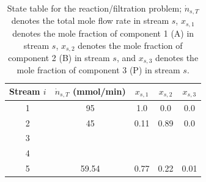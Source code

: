     \begin{table}[!ht]
      \centering
      \caption{State table for the reaction/filtration problem; $\dot{n}_{s,T}$ denotes the total mole flow rate in stream $s$, 
      $x_{s,1}$ denotes the mole fraction of component 1 (A) in stream $s$, 
      $x_{s,2}$ denotes the mole fraction of component 2 (B) in stream $s$, and
      $x_{s,3}$ denotes the mole fraction of component 3 (P) in stream $s$.}\label{tbl-reactor-filter}
    
      \renewcommand{\arraystretch}{2.0}
      \setlength{\tabcolsep}{14pt}
      \begin{tabular}{c|c|c|c|c}\toprule
      Stream $i$ & $\dot{n}_{s,T}$ (mmol/min) & $x_{s,1}$ & $x_{s,2}$ & $x_{s,3}$ \\ \bottomrule
      1 & 95 & 1.0 & 0.0 & 0.0 \\ \hline
      2 & 45 & 0.11 & 0.89 & 0.0   \\ \hline
      3 & & & &   \\ \hline
      4 & & & & \\ \hline
      5 & 59.54 & 0.77 & 0.22 & 0.01 \\ \bottomrule
      \end{tabular}
    \end{table}